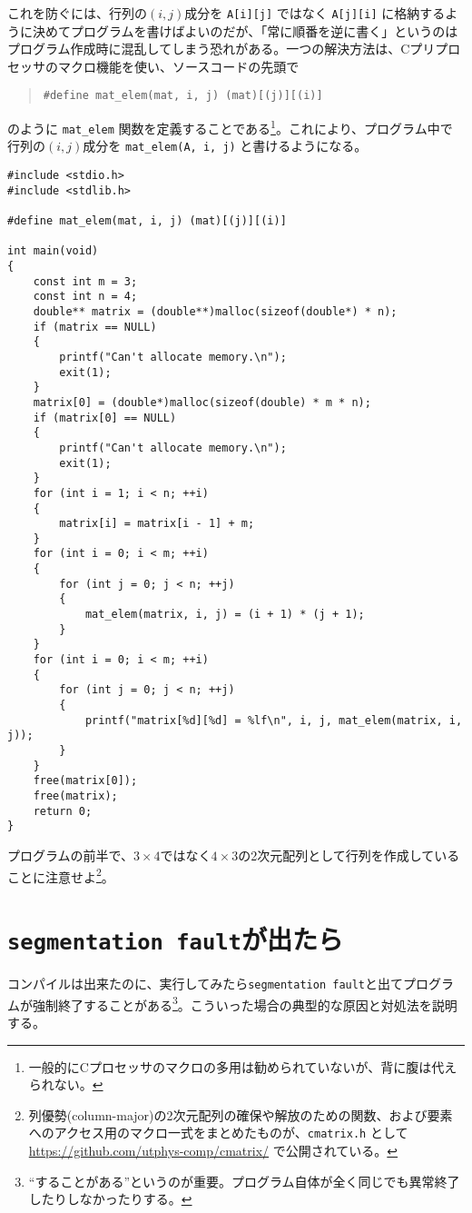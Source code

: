 これを防ぐには、行列の\((i,j)\)成分を \texttt{A[i][j]} ではなく \texttt{A[j][i]} に格納するように決めてプログラムを書けばよいのだが、「常に順番を逆に書く」というのはプログラム作成時に混乱してしまう恐れがある。一つの解決方法は、Cプリプロセッサのマクロ機能を使い、ソースコードの先頭で
\begin{quote}
    \begin{verbatim}
#define mat_elem(mat, i, j) (mat)[(j)][(i)]
\end{verbatim}
\end{quote}
のように \texttt{mat\_elem} 関数を定義することである\footnote{一般的にCプロセッサのマクロの多用は勧められていないが、背に腹は代えられない。}。これにより、プログラム中で行列の\((i,j)\)成分を \texttt{mat\_elem(A, i, j)} と書けるようになる。
\begin{reidai}\label{ex:malloc-2dim-column-major}
    \begin{verbatim}
#include <stdio.h>
#include <stdlib.h>

#define mat_elem(mat, i, j) (mat)[(j)][(i)]

int main(void)
{
    const int m = 3;
    const int n = 4;
    double** matrix = (double**)malloc(sizeof(double*) * n);
    if (matrix == NULL)
    {
        printf("Can't allocate memory.\n");
        exit(1);
    }
    matrix[0] = (double*)malloc(sizeof(double) * m * n);
    if (matrix[0] == NULL)
    {
        printf("Can't allocate memory.\n");
        exit(1);
    }
    for (int i = 1; i < n; ++i)
    {
        matrix[i] = matrix[i - 1] + m;
    }
    for (int i = 0; i < m; ++i)
    {
        for (int j = 0; j < n; ++j)
        {
            mat_elem(matrix, i, j) = (i + 1) * (j + 1);
        }
    }
    for (int i = 0; i < m; ++i)
    {
        for (int j = 0; j < n; ++j)
        {
            printf("matrix[%d][%d] = %lf\n", i, j, mat_elem(matrix, i, j));
        }
    }
    free(matrix[0]);
    free(matrix);
    return 0;
}
\end{verbatim}
\end{reidai} \noindent
プログラムの前半で、\(3 \times 4\)ではなく\(4 \times 3\)の2次元配列として行列を作成していることに注意せよ\footnote{列優勢(column-major)の2次元配列の確保や解放のための関数、および要素へのアクセス用のマクロ一式をまとめたものが、\hypertarget{cmatrix}{\texttt{cmatrix.h}} として\url{https://github.com/utphys-comp/cmatrix/} で公開されている。}。

\section{\texttt{segmentation fault}が出たら}
コンパイルは出来たのに、実行してみたら\texttt{segmentation fault}と出てプログラムが強制終了することがある\footnote{``することがある''というのが重要。プログラム自体が全く同じでも異常終了したりしなかったりする。}。こういった場合の典型的な原因と対処法を説明する。

